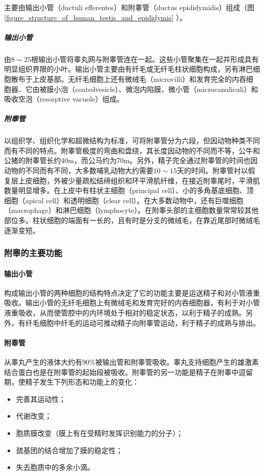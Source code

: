 主要由输出小管（ductuli efferentes）和附睾管（ductus epididymidis）组成（图 \ref{figure_structure_of_human_testis_and_epididymis} ）。

\subparagraph{输出小管}

由$ 8\sim 25 $根输出小管将睾丸网与附睾管连在一起。这些小管聚集在一起并形成具有明显组织界限的小叶。输出小管主要由有纤毛或无纤毛柱状细胞构成，另有淋巴细胞散布于上皮基部。无纤毛细胞上还有微绒毛（microvilli）和发育完全的内吞细胞器．它由被膜小泡（coatedvesicle）、微泡内陷膜、微小管（microcanuliculi）和吸收空泡（resorptive vacuole）组成。

\subparagraph{附睾管}

以组织学、组织化学和超微结构为标准，可将附睾管分为六段，但因动物种类不同而有不同的特点。附睾管极度的弯曲和盘绕，其长度因动物的不同而不等，公牛和公猪的附睾管长约40m，而公马约为70m。另外，精子完全通过附睾管的时间也因动物的不同而有不同，大多数哺乳动物大约需要$ 10\sim 15 $天的时间。附睾管衬以假复层上皮细胞，外被少量疏松结缔组织和环平滑肌纤维，在接近附睾尾时，平滑肌数量明显增多。在上皮中有柱状主细胞（principal cell）、小的多角基底细胞、顶细胞（apical cell）和透明细胞（clear cell）。在大多数动物中，还有巨噬细胞（macrophage）和淋巴细胞（lymphocyte）。在附睾头部的主细胞数量常常较其他部位多。柱状细胞的端面有一长的，且有时是分支的微绒毛，在靠近尾部时微绒毛逐渐变短。

\subsubsection{附睾的主要功能}

\paragraph{输出小管}

构成输出小管的两种细胞的结构特点决定了它的功能主要是运送精子和对小管液重吸收。输出小管的无纤毛细胞上有微绒毛和发育完好的内吞细胞器，有利于对小管液重吸收，从而使管腔中的内环境处于相对的稳定状态，以利于精子的成熟。另外，有纤毛细胞中纤毛的运动可推动精子向附睾管运动，利于精子的成熟与排出。

\paragraph{附睾管}

从睾丸产生的液体大约有90\%被输出管和附睾管吸收。睾丸支持细胞产生的雄激素结合蛋白也是在附睾管的起始段被吸收。附睾管的另一功能是精子在附睾中逗留期，使精子发生下列形态和功能上的变化：
\begin{itemize}
\item 完善其运动性；
\item 代谢改变；
\item 胞质膜改变（膜上有在受精时发挥识别能力的分子）；
\item 巯基团的结合增加了膜的稳定性；
\item 失去胞质中的多余小滴。
\end{itemize}


